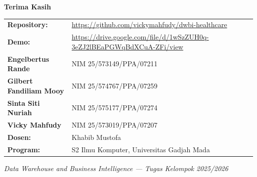 \documentclass[xcolor=table,t,aspectratio=169]{beamer}
\begin{document}
\begin{frame}{}
  \begin{center}
    \vspace{0.8cm}
    {\Large\bfseries\color{ugmblue} Terima Kasih}

    \vspace{0.8cm}
    \scriptsize
    \begin{tabular}{@{}ll@{}}
      \textbf{Repository:}            & \url{https://github.com/vickymahfudy/dwbi-healthcare} \\[5pt]
      \textbf{Demo:}            & \url{https://drive.google.com/file/d/1wSzZUH0q-3eZJ2lBEaPGWqBdXCuA-ZFi/view} \\[5pt]
      \textbf{Engelbertus Rande}      & NIM 25/573149/PPA/07211 \\
      \textbf{Gilbert Fandiliam Mooy} & NIM 25/574767/PPA/07259 \\
      \textbf{Sinta Siti Nuriah}      & NIM 25/575177/PPA/07274 \\
      \textbf{Vicky Mahfudy}          & NIM 25/573019/PPA/07207 \\[6pt]
      \textbf{Dosen:}   & Khabib Mustofa \\
      \textbf{Program:} & S2 Ilmu Komputer, Universitas Gadjah Mada \\
    \end{tabular}

    \vspace{0.8cm}
    {\scriptsize\color{ugmblue}\textit{Data Warehouse and Business Intelligence --- Tugas Kelompok 2025/2026}}
  \end{center}
\end{frame}

\end{document}
